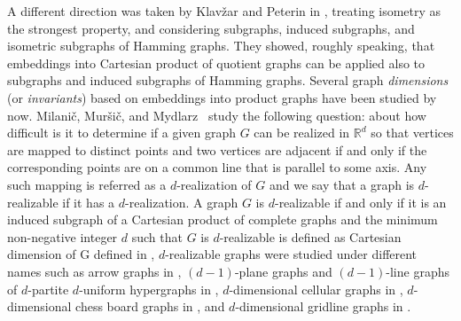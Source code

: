 \documentclass[12pt,a4paper,titlepage,openany]{report}
\begin{document}
A different direction was taken by Klav\v zar and Peterin in \cite{Iztok}, treating isometry as the strongest property, and considering subgraphs, induced subgraphs, and isometric subgraphs of Hamming graphs. They showed, roughly speaking, that embeddings into Cartesian product of quotient graphs can be applied also to subgraphs and induced subgraphs of Hamming graphs. \newline
Several graph \emph{dimensions} (or \emph{invariants}) based on embeddings into product graphs have been studied by now. Milani\v c, Mur\v si\v c, and Mydlarz~\cite{Milanic} study the following question: about how difficult is it to determine if a given graph $G$ can be realized in $\mathbb{R}^d$ so that vertices are mapped to distinct points and two vertices are adjacent if and only if the corresponding points are on a common line that is parallel to some axis.
Any such mapping is referred as a $d$-realization of $G$ and we say that a graph is $d$-realizable if it has a $d$-realization. A graph $G$ is $d$-realizable if and only if it is an induced subgraph of a Cartesian product of complete graphs and the minimum non-negative integer $d$ such that $G$ is $d$-realizable is defined as Cartesian dimension of G defined in \cite{Milanic}, $d$-realizable graphs were studied under different names such as arrow graphs in \cite{Cook}, $(d - 1)$-plane graphs and $(d -1)$-line graphs of $d$-partite $d$-uniform hypergraphs in \cite{Bermond}, $d$-dimensional cellular graphs in \cite{Gurvich}, $d$-dimensional chess board graphs in \cite{Staton}, and $d$-dimensional gridline graphs in \cite{Peterson}.\newline
\end{document}
